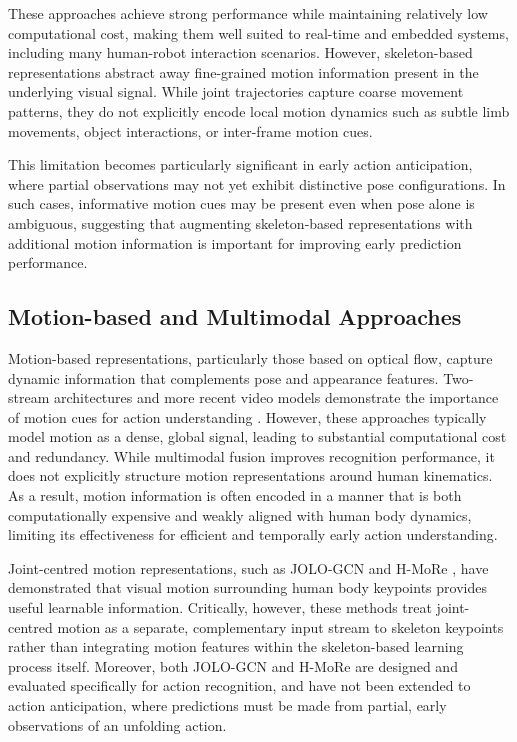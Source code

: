 \documentclass[letterpaper, 10 pt, conference]{ieeeconf}
\begin{document}
These approaches achieve strong performance while maintaining relatively low computational cost, making them well suited to real-time and embedded systems, including many human-robot interaction scenarios. However, skeleton-based representations abstract away fine-grained motion information present in the underlying visual signal. While joint trajectories capture coarse movement patterns, they do not explicitly encode local motion dynamics such as subtle limb movements, object interactions, or inter-frame motion cues.

This limitation becomes particularly significant in early action anticipation, where partial observations may not yet exhibit distinctive pose configurations. In such cases, informative motion cues may be present even when pose alone is ambiguous, suggesting that augmenting skeleton-based representations with additional motion information is important for improving early prediction performance.

\subsection{Motion-based and Multimodal Approaches}
Motion-based representations, particularly those based on optical flow, capture dynamic information that complements pose and appearance features. Two-stream architectures \cite{simonyan2014TwoStreamConvolutionalNetworksActionRecognitionVideos} and more recent video models \cite{tong2022VideoMAEMaskedAutoencodersareDataEfficientLearnersSelfSupervisedVideoPreTraining} demonstrate the importance of motion cues for action understanding \cite{kong2022HumanActionRecognitionPredictionSurvey}. However, these approaches typically model motion as a dense, global signal, leading to substantial computational cost and redundancy. While multimodal fusion improves recognition performance, it does not explicitly structure motion representations around human kinematics. As a result, motion information is often encoded in a manner that is both computationally expensive and weakly aligned with human body dynamics, limiting its effectiveness for efficient and temporally early action understanding.

Joint-centred motion representations, such as JOLO-GCN \cite{cai2021JOLOGCNMiningJointCenteredLightWeightInformationSkeletonBasedActionRecognition} and H-MoRe \cite{huang2025HMoReLearningHumancentricMotionRepresentationActionAnalysis}, have demonstrated that visual motion surrounding human body keypoints provides useful learnable information. Critically, however, these methods treat joint-centred motion as a separate, complementary input stream to skeleton keypoints rather than integrating motion features within the skeleton-based learning process itself. Moreover, both JOLO-GCN and H-MoRe are designed and evaluated specifically for action recognition, and have not been extended to action anticipation, where predictions must be made from partial, early observations of an unfolding action.
\end{document}
